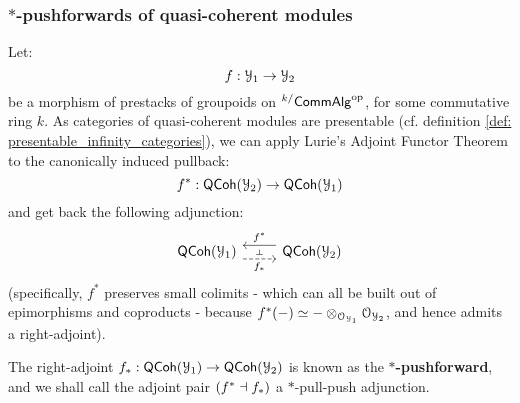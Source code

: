             \subsubsection{\texorpdfstring{$*$}{}-pushforwards of quasi-coherent modules} \label{subsubsection: qcoh_*_pushforwards}
                \begin{remark} \label{remark: existence_of_*_pushforwards}
                    Let:
                        $$f: \mathcal{Y}_1 \to \mathcal{Y}_2$$
                    be a morphism of prestacks of groupoids on ${}^{k/}\mathsf{Comm}\mathsf{Alg}^{\mathrm{op}}$, for some commutative ring $k$. As categories of quasi-coherent modules are presentable (cf. definition \ref{def: presentable_infinity_categories}), we can apply Lurie's Adjoint Functor Theorem \cite[Corollary 5.5.2.9]{HTT} to the canonically induced pullback:
                        $$f^*: \mathsf{QCoh}(\mathcal{Y}_2) \to \mathsf{QCoh}(\mathcal{Y}_1)$$
                    and get back the following adjunction:
                        $$
                            \begin{tikzcd}
                            	{\QCoh(\calY_1)} & {\QCoh(\calY_2)}
                            	\arrow[""{name=0, anchor=center, inner sep=0}, "{f^*}"', shift right=2, from=1-2, to=1-1]
                            	\arrow[""{name=1, anchor=center, inner sep=0}, "{f_*}"', shift right=2, from=1-1, to=1-2, dashed]
                            	\arrow["\dashv"{anchor=center, rotate=-90}, draw=none, from=0, to=1]
                            \end{tikzcd}
                        $$
                    (specifically, $f^*$ preserves small colimits - which can all be built out of epimorphisms and coproducts - because $f^*(-) \cong - \tensor_{\calO_{\calY_1}} \calO_{\calY_2}$, and hence admits a right-adjoint). 
                    
                    The right-adjoint $f_*: \mathsf{QCoh}(\mathcal{Y}_1) \to \mathsf{QCoh}(\mathcal{Y}_2)$ is known as the \textbf{$*$-pushforward}, and we shall call the adjoint pair $(f^* \dashv f_*)$ a $*$-pull-push adjunction.
                \end{remark}
            
